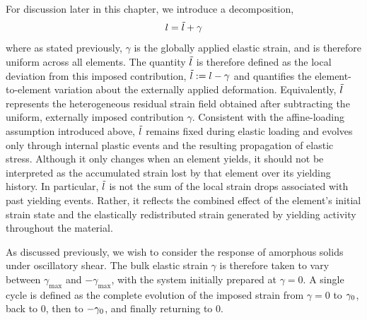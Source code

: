 For discussion later in this chapter, we introduce a decomposition,
\[
    l = \tilde{l} + \gamma
\]
where as stated previously, $\gamma$ is the globally applied elastic strain, and is therefore uniform across all elements. The quantity $\tilde{l}$ is therefore defined as the local deviation from this imposed contribution, $\tilde{l} := l - \gamma$ and quantifies the element-to-element variation about the externally applied deformation. Equivalently, $\tilde{l}$ represents the heterogeneous residual strain field obtained after subtracting the uniform, externally imposed contribution $\gamma$. Consistent with the affine-loading assumption introduced above, $\tilde{l}$ remains fixed during elastic loading and evolves only through internal plastic events and the resulting propagation of elastic stress. Although it only changes when an element yields, it should not be interpreted as the accumulated strain lost by that element over its yielding history. In particular, $\tilde{l}$ is not the sum of the local strain drops associated with past yielding events. Rather, it reflects the combined effect of the element’s initial strain state and the elastically redistributed strain generated by yielding activity throughout the material.

As discussed previously, we wish to consider the response of amorphous solids under oscillatory shear. The bulk elastic strain $\gamma$ is therefore taken to vary between $\gamma_{\max}$ and $-\gamma_{\max}$, with the system initially prepared at $\gamma = 0$. A single cycle is defined as the complete evolution of the imposed strain from $\gamma=0$ to $\gamma_0$, back to $0$, then to $-\gamma_0$, and finally returning to $0$. 

